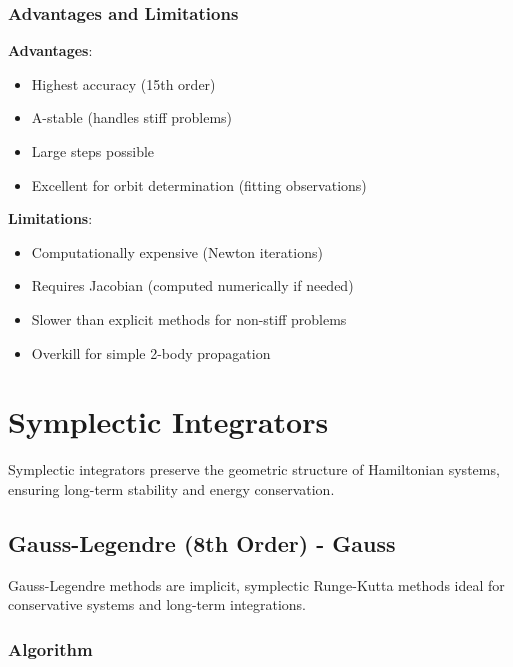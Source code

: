 \subsubsection{Advantages and Limitations}

\textbf{Advantages}:
\begin{itemize}
    \item Highest accuracy (15th order)
    \item A-stable (handles stiff problems)
    \item Large steps possible
    \item Excellent for orbit determination (fitting observations)
\end{itemize}

\textbf{Limitations}:
\begin{itemize}
    \item Computationally expensive (Newton iterations)
    \item Requires Jacobian (computed numerically if needed)
    \item Slower than explicit methods for non-stiff problems
    \item Overkill for simple 2-body propagation
\end{itemize}

\section{Symplectic Integrators}

Symplectic integrators preserve the geometric structure of Hamiltonian systems, ensuring long-term stability and energy conservation.

\subsection{Gauss-Legendre (8th Order) - Gauss}

Gauss-Legendre methods are implicit, symplectic Runge-Kutta methods ideal for conservative systems and long-term integrations.

\subsubsection{Algorithm}

